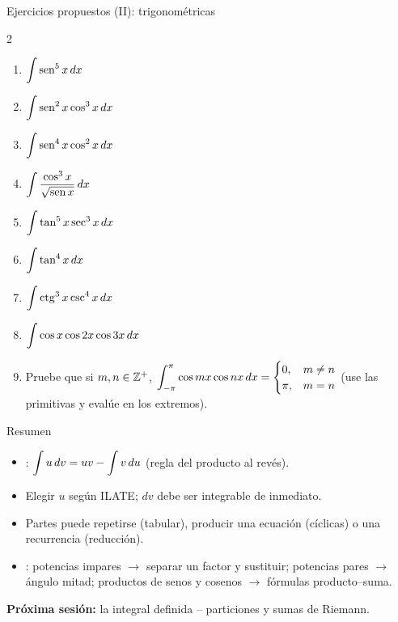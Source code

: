 \documentclass[10pt,aspectratio=169]{beamer}
\begin{document}
\begin{frame}{Ejercicios propuestos (II): trigonométricas}
  \begin{ejercicio}
    \begin{multicols}{2}
    \begin{enumerate}
      \item $\displaystyle\int\operatorname{sen}^5x\,dx$
      \item $\displaystyle\int\operatorname{sen}^2x\cos^3x\,dx$
      \item $\displaystyle\int\operatorname{sen}^4x\cos^2x\,dx$
      \item $\displaystyle\int\frac{\cos^3x}{\sqrt{\operatorname{sen} x}}\,dx$
      \item $\displaystyle\int\tan^5x\sec^3x\,dx$
      \item $\displaystyle\int\tan^4x\,dx$
      \item $\displaystyle\int\operatorname{ctg}^3x\operatorname{csc}^4x\,dx$
      \item $\displaystyle\int\cos x\cos2x\cos3x\,dx$
    \end{enumerate}
    \end{multicols}
  \end{ejercicio}
  \begin{ejercicio}[: aplicación]
    \begin{enumerate}
      \setcounter{enumi}{8}
      \item Pruebe que si $m,n\in\mathbb{Z}^+$, $\displaystyle\int_{-\pi}^{\pi}\cos mx\cos nx\,dx=\begin{cases}0,&m\ne n\\ \pi,&m=n\end{cases}$
        (use las primitivas y evalúe en los extremos).
    \end{enumerate}
  \end{ejercicio}
\end{frame}

\begin{frame}{Resumen}
  \begin{itemize}
    \item {}: $\displaystyle\int u\,dv=uv-\int v\,du$ (regla del producto al revés).
    \item Elegir $u$ según ILATE; $dv$ debe ser integrable de inmediato.
    \item Partes puede repetirse (tabular), producir una ecuación (cíclicas) o una recurrencia (reducción).
    \item {}: potencias impares $\to$ separar un factor y sustituir; potencias
      pares $\to$ ángulo mitad; productos de senos y cosenos $\to$ fórmulas producto--suma.
  \end{itemize}
  \vspace{3mm}
  \textbf{Próxima sesión:} la integral definida -- particiones y sumas de Riemann.
\end{frame}
\end{document}
